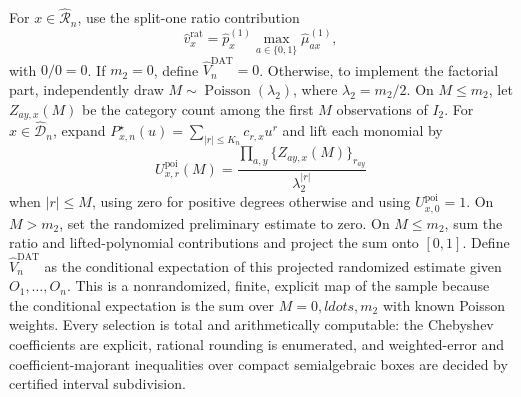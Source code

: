 For \(x\in\widehat{\mathcal R}_n\), use the split-one ratio contribution
\[
 \widehat v_x^{\mathrm{rat}}
 =\widehat p_x^{(1)}\max_{a\in\{0,1\}}\widehat\mu_{ax}^{(1)},
\]
with \(0/0=0\).  If \(m_2=0\), define \(\widehat V_n^{\mathrm{DAT}}=0\).  Otherwise, to implement the factorial part, independently draw \(M\sim\operatorname{Poisson}(\lambda_2)\), where \(\lambda_2=m_2/2\).  On \(M\le m_2\), let \(Z_{ay,x}(M)\) be the category count among the first \(M\) observations of \(I_2\).  For \(x\in\widehat{\mathcal D}_n\), expand \(P^\star_{x,n}(u)=\sum_{\lvert r\rvert\le K_n}c_{r,x}u^r\) and lift each monomial by
\[
 U^{\mathrm{poi}}_{x,r}(M)=
 \frac{\prod_{a,y}\{Z_{ay,x}(M)\}_{r_{ay}}}
 {\lambda_2^{\lvert r\rvert}}
\]
when \(\lvert r\rvert\le M\), using zero for positive degrees otherwise and using \(U^{\mathrm{poi}}_{x,0}=1\).  On \(M>m_2\), set the randomized preliminary estimate to zero.  On \(M\le m_2\), sum the ratio and lifted-polynomial contributions and project the sum onto \([0,1]\).  Define \(\widehat V_n^{\mathrm{DAT}}\) as the conditional expectation of this projected randomized estimate given \(O_1,\ldots,O_n\).  This is a nonrandomized, finite, explicit map of the sample because the conditional expectation is the sum over \(M=0,ldots,m_2\) with known Poisson weights.  Every selection is total and arithmetically computable: the Chebyshev coefficients are explicit, rational rounding is enumerated, and weighted-error and coefficient-majorant inequalities over compact semialgebraic boxes are decided by certified interval subdivision.